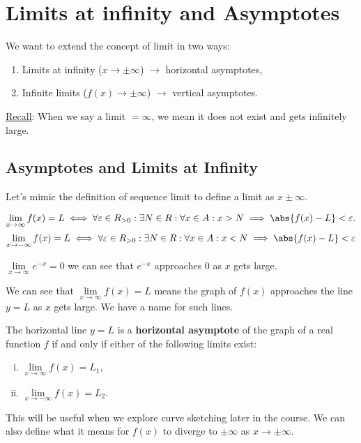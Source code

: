 \section{Limits at infinity and Asymptotes}
We want to extend the concept of limit in two ways:
\begin{enumerate}[(1)]
    \item Limits at infinity ($ x\to\pm\infty $) $ \to $ horizontal asymptotes,
    \item Infinite limits ($ f(x)\to\pm\infty $) $ \to $ vertical asymptotes.
\end{enumerate}
\underline{Recall}: When we say a limit $ =\infty $, we mean it does not exist and gets infinitely large.
\subsection{Asymptotes and Limits at Infinity}
Let's mimic the definition of sequence limit to define a limit as $ x\pm\infty $.
\begin{Definition}{}{}
    \[ \lim\limits_{{x} \to {\infty}}f(x)=L\iff
        \forall \varepsilon\in\R_{>0}:\exists N\in\R:\forall x\in A:x>N\implies \abs{f(x)-L}<\varepsilon. \]
    \[ \lim\limits_{{x} \to {-\infty}}f(x)=L\iff
        \forall \varepsilon\in\R_{>0}:\exists N\in\R:\forall x\in A:x<N\implies \abs{f(x)-L}<\varepsilon \]
\end{Definition}
\begin{Example}{}{}
    $\lim\limits_{{x} \to {\infty}}e^{-x}=0$ we can see that $ e^{-x} $ approaches $ 0 $
    as $ x $ gets large.
\end{Example}
We can see that $ \lim\limits_{{x} \to {\infty}}f(x)=L $ means the graph of $ f(x) $ approaches
the line $ y=L $ as $ x $ gets large. We have a name for such lines.
\begin{Definition}{}{}
    The horizontal line $ y=L $ is a \textbf{horizontal asymptote} of the graph of a real function $ f $
    if and only if either of the following limits exist:
    \begin{enumerate}[(i)]
        \item $ \lim\limits_{{x} \to {\infty}}f(x)=L_1 $,
        \item $ \lim\limits_{{x} \to {-\infty}}f(x)=L_2 $.
    \end{enumerate}
\end{Definition}
This will be useful when we explore curve sketching later in the course. We can also define what it means for $ f(x) $
to diverge to $ \pm \infty $ as $ x\to\pm\infty $.
